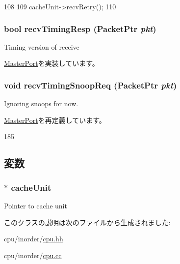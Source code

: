 \begin{DoxyCode}
108 {
109     cacheUnit->recvRetry();
110 }
\end{DoxyCode}
\hypertarget{classInOrderCPU_1_1CachePort_a482dba5588f4bee43e498875a61e5e0b}{
\subsubsection[{recvTimingResp}]{\setlength{\rightskip}{0pt plus 5cm}bool recvTimingResp ({\bf PacketPtr} {\em pkt})}}
\label{classInOrderCPU_1_1CachePort_a482dba5588f4bee43e498875a61e5e0b}
Timing version of receive 

\hyperlink{classMasterPort_abd323548d6c93f8b0543f1fe3a86ca35}{MasterPort}を実装しています。\hypertarget{classInOrderCPU_1_1CachePort_aff3031c56fc4947a19695c868bb8233e}{
\subsubsection[{recvTimingSnoopReq}]{\setlength{\rightskip}{0pt plus 5cm}void recvTimingSnoopReq ({\bf PacketPtr} {\em pkt})}}
\label{classInOrderCPU_1_1CachePort_aff3031c56fc4947a19695c868bb8233e}
Ignoring snoops for now. 

\hyperlink{classMasterPort_ae43c73eff109f907118829fcfa9e7096}{MasterPort}を再定義しています。


\begin{DoxyCode}
185 { }
\end{DoxyCode}


\subsection{変数}
\hypertarget{classInOrderCPU_1_1CachePort_a8abcb7a551e5f3b1e6061a0634c08624}{
\subsubsection[{cacheUnit}]{$\ast$ {\bf cacheUnit}}}
\label{classInOrderCPU_1_1CachePort_a8abcb7a551e5f3b1e6061a0634c08624}
Pointer to cache unit 

このクラスの説明は次のファイルから生成されました:\begin{DoxyCompactItemize}
\item 
cpu/inorder/\hyperlink{inorder_2cpu_8hh}{cpu.hh}\item 
cpu/inorder/\hyperlink{inorder_2cpu_8cc}{cpu.cc}\end{DoxyCompactItemize}
